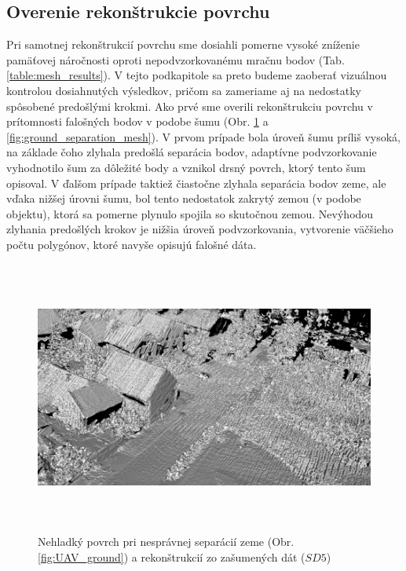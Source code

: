 \subsection{Overenie rekonštrukcie povrchu}
\noindent Pri samotnej rekonštrukcií povrchu sme dosiahli pomerne vysoké zníženie pamäťovej náročnosti oproti nepodvzorkovanému mračnu bodov (Tab. \ref{table:mesh_results}). V tejto podkapitole sa preto budeme zaoberať vizuálnou kontrolou dosiahnutých výsledkov, pričom sa zameriame aj na nedostatky spôsobené predošlými krokmi.
\newline\indent Ako prvé sme overili rekonštrukciu povrchu v prítomnosti falošných bodov v podobe šumu (Obr. \ref{fig:noise_mesh} a \ref{fig:ground_separation_mesh}). V prvom prípade bola úroveň šumu príliš vysoká, na základe čoho zlyhala predošlá separácia bodov, adaptívne podvzorkovanie vyhodnotilo šum za dôležité body a vznikol drsný povrch, ktorý tento šum opisoval. V ďalšom prípade taktiež čiastočne zlyhala separácia bodov zeme, ale vďaka nižšej úrovni šumu, bol tento nedostatok zakrytý zemou (v podobe objektu), ktorá sa pomerne plynulo spojila so skutočnou zemou. Nevýhodou zlyhania predošlých krokov je nižšia úroveň podvzorkovania, vytvorenie väčšieho počtu polygónov, ktoré navyše opisujú falošné dáta.

\begin{figure}[!htbp]
  \centering
  \includegraphics[width=16cm, height=9cm]{img/noise_mesh.png}
  \caption{Nehladký povrch pri nesprávnej separácií zeme (Obr. \ref{fig:UAV_ground}) a rekonštrukcií zo zašumených dát ($SD5$)} 
  \label{fig:noise_mesh}
\end{figure} 

